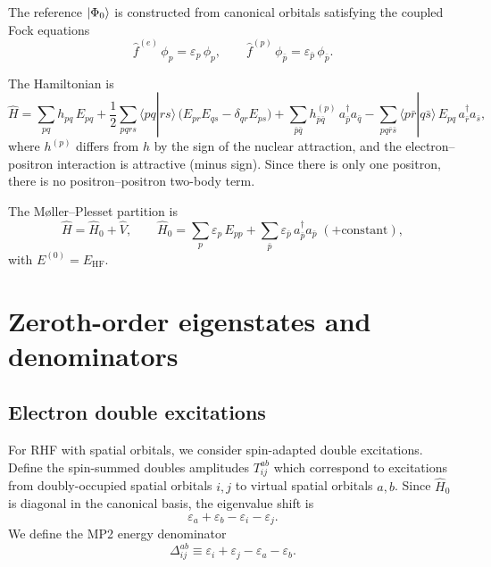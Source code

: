 \documentclass[11pt]{article}
\begin{document}
The reference $\ket{\Phi_0}$ is constructed from canonical orbitals
satisfying the coupled Fock equations
\begin{equation}
\hat f^{(e)}\,\phi_p = \varepsilon_p\,\phi_p,
\qquad
\hat f^{(p)}\,\phi_{\bar p} = \varepsilon_{\bar p}\,\phi_{\bar p}.
\end{equation}

The Hamiltonian is
\begin{equation}
\hat H
=
\sum_{pq} h_{pq}\, E_{pq}
+
\frac{1}{2}\sum_{pqrs} \langle pq | rs\rangle\,
\bigl(E_{pr}E_{qs} - \delta_{qr}E_{ps}\bigr)
+
\sum_{\bar p\bar q} h_{\bar p\bar q}^{(p)}\, a_{\bar p}^\dagger a_{\bar q}
-
\sum_{pq\bar r\bar s} \langle p\bar r | q\bar s \rangle\,
E_{pq}\, a_{\bar r}^\dagger a_{\bar s},
\end{equation}
where $h^{(p)}$ differs from $h$ by the sign of the nuclear attraction,
and the electron--positron interaction is attractive (minus sign).
Since there is only one positron, there is no positron--positron two-body term.

The M{\o}ller--Plesset partition is
\begin{equation}
\hat H = \hat H_0 + \hat V,
\qquad
\hat H_0 = \sum_p \varepsilon_p\, E_{pp}
+ \sum_{\bar p} \varepsilon_{\bar p}\, a_{\bar p}^\dagger a_{\bar p}
\; (+\text{constant}),
\end{equation}
with $E^{(0)} = E_{\mathrm{HF}}$.

\section*{Zeroth-order eigenstates and denominators}

\subsection*{Electron double excitations}

For RHF with spatial orbitals, we consider spin-adapted double excitations.
Define the spin-summed doubles amplitudes $T_{ij}^{ab}$ which correspond to
excitations from doubly-occupied spatial orbitals $i,j$ to virtual spatial
orbitals $a,b$.
Since $\hat H_0$ is diagonal in the canonical basis, the eigenvalue shift is
\begin{equation}
\varepsilon_a + \varepsilon_b - \varepsilon_i - \varepsilon_j.
\end{equation}
We define the MP2 energy denominator
\begin{equation}
\Delta_{ij}^{ab} \equiv \varepsilon_i + \varepsilon_j - \varepsilon_a - \varepsilon_b.
\end{equation}
\end{document}
